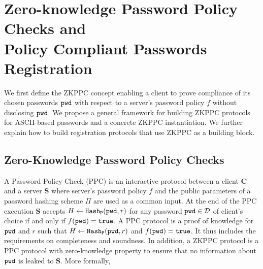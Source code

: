 \section{Zero-knowledge Password Policy Checks and\\ Policy Compliant Passwords Registration} \label{sec:vpake-registration}




We first define the ZKPPC concept enabling a client to prove compliance of its chosen passwords $\mathtt{pwd}$ with respect to a server's password policy $f$ without disclosing $\mathtt{pwd}$. We propose a general framework for building ZKPPC protocols for ASCII-based passwords and a concrete ZKPPC instantiation. We further explain how to build registration protocols that use ZKPPC as a building block.

\subsection{Zero-Knowledge Password Policy Checks}
A Password Policy Check (PPC) is an interactive protocol between a client $\bm{C}$ and a server $\bm{S}$ where server's password policy $f$ and the public parameters of a password hashing scheme $\Pi$ are used as a common input. At the end of the PPC execution $\bm{S}$ accepts $H\gets \mathtt{Hash_P}(\mathtt{pwd},r)$ for any password $\mathtt{pwd}\in\mathcal{D}$ of client's choice if and only if $f(\mathtt{pwd})=\mathtt{true}$. A PPC protocol is a proof of knowledge for $\mathtt{pwd}$ and $r$ such that $H\gets \mathtt{Hash_P}(\mathtt{pwd},r)$ and $f(\mathtt{pwd})=\mathtt{true}$. It thus includes the requirements on completeness and soundness. In addition, a ZKPPC protocol is a PPC protocol with zero-knowledge property to ensure that no information about $\mathtt{pwd}$ is leaked to $\bm{S}$. More formally, %

